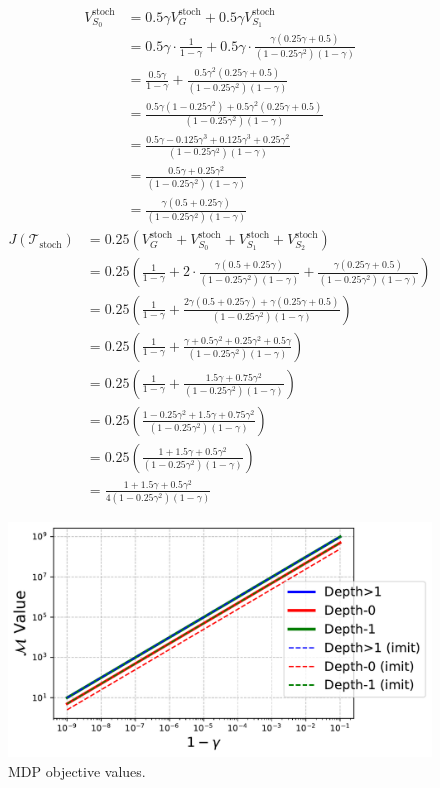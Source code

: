 \begin{align*}
    V^{\text{stoch}}_{S_0} &= 0.5\gamma V^{\text{stoch}}_G + 0.5\gamma V^{\text{stoch}}_{S_1} \\
    &= 0.5\gamma \cdot \frac{1}{1-\gamma} + 0.5\gamma \cdot \frac{\gamma(0.25\gamma + 0.5)}{(1 - 0.25\gamma^2)(1-\gamma)} \\
    &= \frac{0.5\gamma}{1-\gamma} + \frac{0.5\gamma^2(0.25\gamma + 0.5)}{(1 - 0.25\gamma^2)(1-\gamma)} \\
    &= \frac{0.5\gamma(1 - 0.25\gamma^2) + 0.5\gamma^2(0.25\gamma + 0.5)}{(1 - 0.25\gamma^2)(1-\gamma)} \\
    &= \frac{0.5\gamma - 0.125\gamma^3 + 0.125\gamma^3 + 0.25\gamma^2}{(1 - 0.25\gamma^2)(1-\gamma)} \\
    &= \frac{0.5\gamma + 0.25\gamma^2}{(1 - 0.25\gamma^2)(1-\gamma)} \\
    &= \frac{\gamma(0.5 + 0.25\gamma)}{(1 - 0.25\gamma^2)(1-\gamma)}
\end{align*}
\begin{align*}
    J(\mathcal{T}_{\text{stoch}}) &= 0.25(V^{\text{stoch}}_G + V^{\text{stoch}}_{S_0} + V^{\text{stoch}}_{S_1} + V^{\text{stoch}}_{S_2}) \\
    &= 0.25\left(\frac{1}{1-\gamma} + 2 \cdot \frac{\gamma(0.5 + 0.25\gamma)}{(1 - 0.25\gamma^2)(1-\gamma)} + \frac{\gamma(0.25\gamma + 0.5)}{(1 - 0.25\gamma^2)(1-\gamma)}\right) \\
    &= 0.25\left(\frac{1}{1-\gamma} + \frac{2\gamma(0.5 + 0.25\gamma) + \gamma(0.25\gamma + 0.5)}{(1 - 0.25\gamma^2)(1-\gamma)}\right) \\
    &= 0.25\left(\frac{1}{1-\gamma} + \frac{\gamma + 0.5\gamma^2 + 0.25\gamma^2 + 0.5\gamma}{(1 - 0.25\gamma^2)(1-\gamma)}\right) \\
    &= 0.25\left(\frac{1}{1-\gamma} + \frac{1.5\gamma + 0.75\gamma^2}{(1 - 0.25\gamma^2)(1-\gamma)}\right) \\
    &= 0.25\left(\frac{1 - 0.25\gamma^2 + 1.5\gamma + 0.75\gamma^2}{(1 - 0.25\gamma^2)(1-\gamma)}\right) \\
    &= 0.25\left(\frac{1 + 1.5\gamma + 0.5\gamma^2}{(1 - 0.25\gamma^2)(1-\gamma)}\right) \\
    &= \frac{1 + 1.5\gamma + 0.5\gamma^2}{4(1 - 0.25\gamma^2)(1-\gamma)}
\end{align*}
\begin{figure}
    \centering
    \includegraphics[width=1\textwidth]{images/images_part1/policy_values_comparison.pdf}
    \caption{MDP objective values.}\label{fig:objectives}
\end{figure}
